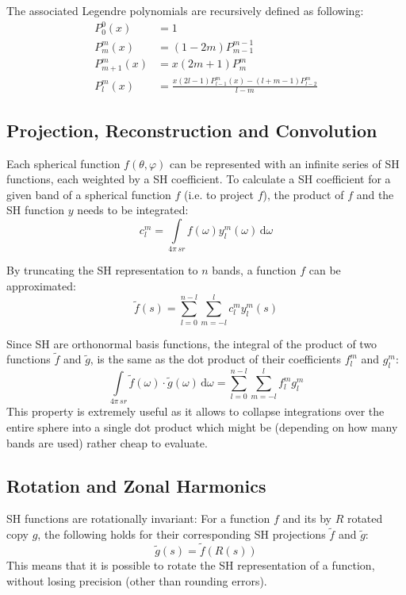 \documentclass[thesis.tex]{subfiles}
\begin{document}
The associated Legendre polynomials are recursively defined as following:
\begin{equation}
	\begin{alignedat}{2}
		P^0_0(x) &= 1\\
		P^m_m(x) &= (1-2m)P^{m-1}_{m-1}\\
		P^m_{m+1}(x) &= x(2m+1)P^m_m\\	
		P^m_l(x) &= \frac{x(2l-1)P^m_{l-1}(x)-(l+m-1)P^m_{l-2}}{l-m}
	\end{alignedat}
\end{equation}


\subsection{Projection, Reconstruction and Convolution} \label{sec:preq:shprojectrecon}
Each spherical function $f(\theta, \varphi)$ can be represented with an infinite series of SH functions, each weighted by a SH coefficient.
To calculate a SH coefficient for a given band of a spherical function $f$ (i.e. to project $f$), the product of $f$ and the SH function $y$ needs to be integrated:
\begin{equation} \label{eq:shprojection}
	c^m_l=\int\limits_{4\pi\,sr} f(\omega)y^m_l(\omega)\, \mathrm{d}\omega
\end{equation}

By truncating the SH representation to $n$ bands, a function $f$ can be approximated:
\begin{equation}
	\widetilde{f}(s) = \sum_{l=0}^{n-l}\sum_{m=-l}^l c_l^m y_l^m(s)
\end{equation}

Since SH are orthonormal basis functions, the integral of the product of two functions $\widetilde{f}$ and $\widetilde{g}$, is the same as the dot product of their coefficients $f_l^m$ and $g_l^m$:
\begin{equation}
	\int\limits_{4\pi\,sr} \widetilde{f}(\omega) \cdot \widetilde{g}(\omega) \, \mathrm{d}\omega =
	\sum_{l=0}^{n-l}\sum_{m=-l}^l f_l^m g_l^m
\end{equation}
This property is extremely useful as it allows to collapse integrations over the entire sphere into a single dot product which might be (depending on how many bands are used) rather cheap to evaluate.

\subsection{Rotation and Zonal Harmonics} \label{sec:preq:zonalharmonics}
SH functions are rotationally invariant:
For a function $f$ and its by $R$ rotated copy $g$, the following holds for their corresponding SH projections $\widetilde{f}$ and $\widetilde{g}$:
\begin{equation}
\widetilde{g}(s) = \widetilde{f}(R(s))
\end{equation}
This means that it is possible to rotate the SH representation of a function, without losing precision (other than rounding errors).
\end{document}
